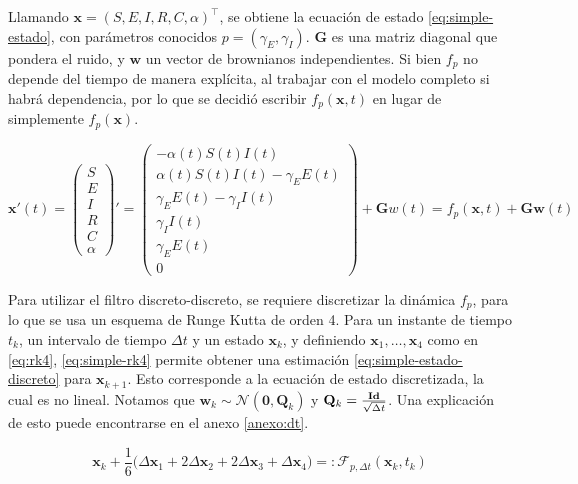 Llamando \(\mathbf{x} = (S, E, I, R, C, \alpha)^{\top}\), se obtiene la ecuación de estado \ref{eq:simple-estado}, con parámetros conocidos \(p = (\gamma_E, \gamma_I)\). \(\mathbf{G}\) es una matriz diagonal que pondera el ruido, y \(\mathbf{w}\) un vector de brownianos independientes. Si bien \(f_p\) no depende del tiempo de manera explícita, al trabajar con el modelo completo si habrá dependencia, por lo que se decidió escribir \(f_p(\mathbf{x}, t)\) en lugar de simplemente \(f_p(\mathbf{x})\).

\begin{equation} \label{eq:simple-estado}
\mathbf{x}'(t) =
\begin{pmatrix}
S \\
E\\
I\\
R\\
C\\
\alpha 
\end{pmatrix}' = 
\begin{pmatrix} 
-\alpha(t) S(t)I(t) \\
\alpha(t) S(t)I(t) - \gamma_E E(t) \\ 
\gamma_E E(t) - \gamma_{I} I(t)\\
\gamma_{I} I(t) \\
\gamma_E E(t) \\
0
\end{pmatrix} + \mathbf{G} w(t)= f_p(\mathbf{x}, t) + \mathbf{G} \mathbf{w}(t)
\end{equation}

Para utilizar el filtro discreto-discreto, se requiere discretizar la dinámica \(f_p\), para lo que se usa un esquema de Runge Kutta de orden 4. Para un instante de tiempo \(t_k\), un intervalo de tiempo \(\Delta t\) y un estado \(\mathbf{x}_k\), y definiendo \(\mathbf{x}_1, \dots, \mathbf{x}_4\) como en \ref{eq:rk4}, \ref{eq:simple-rk4} permite obtener una estimación \ref{eq:simple-estado-discreto} para \(\mathbf{x}_{k+1}\). Esto corresponde a la ecuación de estado discretizada, la cual es no lineal. Notamos que \(\mathbf{w}_{k} \sim \mathcal{N}(\mathbf{0}, \mathbf{Q}_k)\) y \(\mathbf{Q}_k = \frac{\text{\textbf{Id}}}{\sqrt{\Delta t}}\). Una explicación de esto puede encontrarse en el anexo \ref{anexo:dt}.

\begin{equation} \label{eq:simple-rk4}
\mathbf{x}_{k} + \frac{1}{6}\Big( \Delta \mathbf{x}_1  +  2\Delta \mathbf{x}_2 + 2\Delta \mathbf{x}_3 +\Delta \mathbf{x}_4\Big) =: \mathcal{F}_{p, \Delta t}(\mathbf{x}_k, t_k)
\end{equation}


